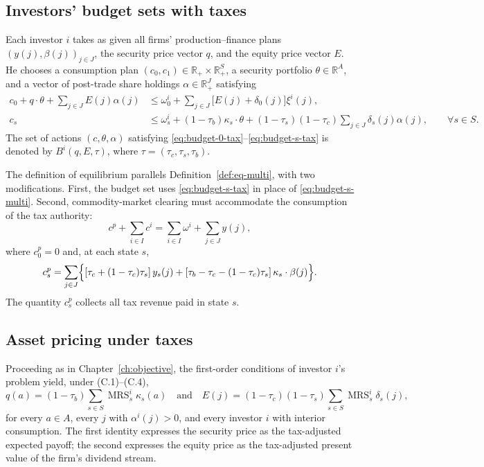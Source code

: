 \documentclass[11pt,a4paper,oneside]{book}
\def\R{\mathbb{R}}
\def\leq{\leqslant}
\def\et{\quad \text{and} \quad}
\DeclareMathOperator{\MRS}{MRS}
\theoremstyle{plain}
\theoremstyle{definition}
\theoremstyle{remark}
\numberwithin{equation}{chapter}
\begin{document}
\subsection{Investors' budget sets with taxes}

Each investor $i$ takes as given all firms' production--finance plans $(y(j), \beta(j))_{j \in J}$, the security price vector $q$, and the equity price vector $E$.
He chooses a consumption plan $(c_0, c_1) \in \R_+ \times \R_+^S$, a security portfolio $\theta \in \R^A$, and a vector of post-trade share holdings $\alpha \in \R_+^J$ satisfying
\begin{align}
  c_0 + q \cdot \theta + \sum_{j \in J} E(j) \alpha(j)
  &\leq
  \omega^i_0 + \sum_{j \in J} \bigl[ E(j) + \delta_0(j) \bigr] \xi^i(j),
  \label{eq:budget-0-tax}\\[2pt]
  c_s
  &\leq
  \omega^i_s + (1 - \tau_b) \kappa_s \cdot \theta + (1-\tau_s)(1-\tau_c) \sum_{j \in J} \delta_s(j) \alpha(j),
  \qquad \forall s \in S.
  \label{eq:budget-s-tax}
\end{align}
The set of actions $(c, \theta, \alpha)$ satisfying \eqref{eq:budget-0-tax}--\eqref{eq:budget-s-tax} is denoted by $B^i(q, E, \tau)$, where $\tau = (\tau_c, \tau_s, \tau_b)$.

The definition of equilibrium parallels Definition~\ref{def:eq-multi}, with two modifications.
First, the budget set uses \eqref{eq:budget-s-tax} in place of \eqref{eq:budget-s-multi}.
Second, commodity-market clearing must accommodate the consumption of the tax authority:
\begin{equation*}
  c^p + \sum_{i \in I} c^i = \sum_{i \in I} \omega^i + \sum_{j \in J} y(j),
\end{equation*}
where $c^p_0 = 0$ and, at each state $s$,
\begin{equation*}
  c^p_s = \sum_{j \in J} \Bigl\{ [\tau_c + (1-\tau_c)\tau_s] \, y_s(j) + [\tau_b - \tau_c - (1-\tau_c)\tau_s] \, \kappa_s \cdot \beta(j) \Bigr\}.
\end{equation*}
The quantity $c^p_s$ collects all tax revenue paid in state $s$.

\subsection{Asset pricing under taxes}

Proceeding as in Chapter~\ref{ch:objective}, the first-order conditions of investor $i$'s problem yield, under \textup{(C.1)--(C.4)},
\begin{equation}\label{eq:price-tax}
  q(a) = (1-\tau_b) \sum_{s \in S} \MRS^i_s \kappa_s(a)
  \et
  E(j) = (1-\tau_c)(1-\tau_s) \sum_{s \in S} \MRS^i_s \delta_s(j),
\end{equation}
for every $a \in A$, every $j$ with $\alpha^i(j) > 0$, and every investor $i$ with interior consumption.
The first identity expresses the security price as the tax-adjusted expected payoff; the second expresses the equity price as the tax-adjusted present value of the firm's dividend stream.
\end{document}
